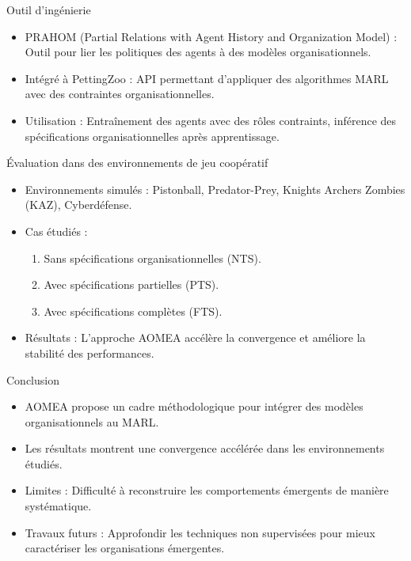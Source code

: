 \documentclass{beamer}
\begin{document}
\begin{frame}{Outil d'ingénierie}
    \begin{itemize}
        \item PRAHOM (Partial Relations with Agent History and Organization Model) : Outil pour lier les politiques des agents à des modèles organisationnels.
        \item Intégré à PettingZoo : API permettant d'appliquer des algorithmes MARL avec des contraintes organisationnelles.
        \item Utilisation : Entraînement des agents avec des rôles contraints, inférence des spécifications organisationnelles après apprentissage.
    \end{itemize}
\end{frame}

\begin{frame}{Évaluation dans des environnements de jeu coopératif}
    \begin{itemize}
        \item Environnements simulés : Pistonball, Predator-Prey, Knights Archers Zombies (KAZ), Cyberdéfense.
        \item Cas étudiés :
        \begin{enumerate}
            \item Sans spécifications organisationnelles (NTS).
            \item Avec spécifications partielles (PTS).
            \item Avec spécifications complètes (FTS).
        \end{enumerate}
        \item Résultats : L'approche AOMEA accélère la convergence et améliore la stabilité des performances.
    \end{itemize}
\end{frame}

\begin{frame}{Conclusion}
    \begin{itemize}
        \item AOMEA propose un cadre méthodologique pour intégrer des modèles organisationnels au MARL.
        \item Les résultats montrent une convergence accélérée dans les environnements étudiés.
        \item Limites : Difficulté à reconstruire les comportements émergents de manière systématique.
        \item Travaux futurs : Approfondir les techniques non supervisées pour mieux caractériser les organisations émergentes.
    \end{itemize}
\end{frame}
\end{document}
